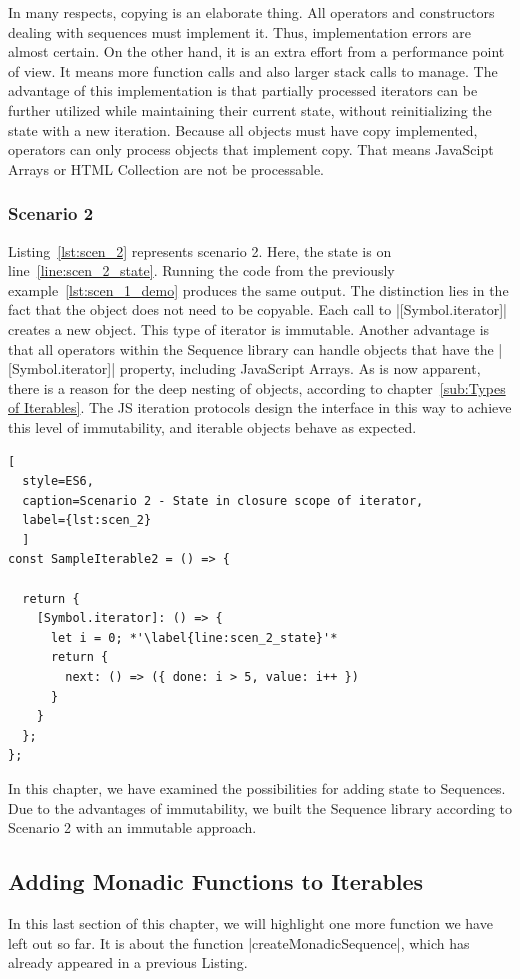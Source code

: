 In many respects, copying is an elaborate thing. All operators and constructors 
dealing with sequences must implement it. Thus, implementation errors are 
almost certain. On the other hand, it is an extra effort from a performance point 
of view. It means more function calls and also larger stack calls to manage.
The advantage of this implementation is that partially processed iterators can
be further utilized while maintaining their current state, without
reinitializing the state with a new iteration.
Because all objects must have copy implemented, operators can 
only process objects that implement copy. That means JavaScipt Arrays or HTML 
Collection are not be processable.

\subsubsection{Scenario 2}
Listing~\ref{lst:scen_2} represents scenario 2. Here, the state is on 
line~\ref{line:scen_2_state}. Running the code from the previously
example~\ref{lst:scen_1_demo} produces the same output. The distinction lies in
the fact that the object does not need to be copyable. Each call to |[Symbol.iterator]| 
creates a new object. This type of iterator is immutable. Another advantage is
that all operators within the Sequence library can handle objects that have the
|[Symbol.iterator]| property, including JavaScript Arrays.
\newline
As is now apparent, there is a reason for the deep nesting of objects, according 
to chapter~\ref{sub:Types of Iterables}. The JS iteration protocols design the 
interface in this way to achieve this level of immutability, and iterable 
objects behave as expected.

\begin{lstlisting}[
  style=ES6, 
  caption=Scenario 2 - State in closure scope of iterator,
  label={lst:scen_2}
  ]
const SampleIterable2 = () => {

  return {
    [Symbol.iterator]: () => {
      let i = 0; *'\label{line:scen_2_state}'*
      return {
        next: () => ({ done: i > 5, value: i++ })
      }
    }
  };
};
\end{lstlisting}

In this chapter, we have examined the possibilities for adding state to 
Sequences. Due to the advantages of immutability, we built the Sequence library 
according to Scenario 2 with an immutable approach.


\subsection{Adding Monadic Functions to Iterables}
\label{sub:Adding Monadic Functions to Iterables}
In this last section of this chapter, we will highlight one more function we 
have left out so far. It is about the function |createMonadicSequence|, which has
already appeared in a previous Listing.

